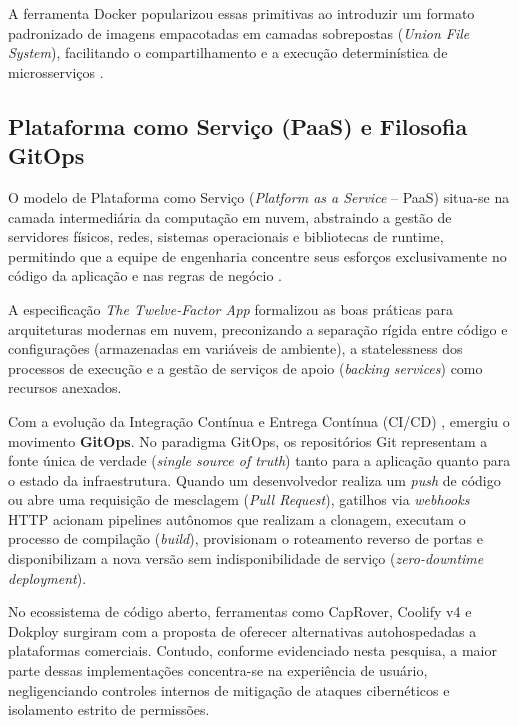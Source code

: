 A ferramenta Docker popularizou essas primitivas ao introduzir um formato padronizado de imagens empacotadas em camadas sobrepostas (\textit{Union File System}), facilitando o compartilhamento e a execução determinística de microsserviços \cite{merkel2014,combes2016}.

\subsection{Plataforma como Serviço (PaaS) e Filosofia GitOps}
\label{sec:paas-gitops}

O modelo de Plataforma como Serviço (\textit{Platform as a Service} -- PaaS) situa-se na camada intermediária da computação em nuvem, abstraindo a gestão de servidores físicos, redes, sistemas operacionais e bibliotecas de runtime, permitindo que a equipe de engenharia concentre seus esforços exclusivamente no código da aplicação e nas regras de negócio \cite{bass2015,newman2021}. 

A especificação \textit{The Twelve-Factor App} \cite{wiggins2017} formalizou as boas práticas para arquiteturas modernas em nuvem, preconizando a separação rígida entre código e configurações (armazenadas em variáveis de ambiente), a statelessness dos processos de execução e a gestão de serviços de apoio (\textit{backing services}) como recursos anexados.

Com a evolução da Integração Contínua e Entrega Contínua (CI/CD) \cite{fowler2006,humble2010}, emergiu o movimento \textbf{GitOps}. No paradigma GitOps, os repositórios Git representam a fonte única de verdade (\textit{single source of truth}) tanto para a aplicação quanto para o estado da infraestrutura. Quando um desenvolvedor realiza um \textit{push} de código ou abre uma requisição de mesclagem (\textit{Pull Request}), gatilhos via \textit{webhooks} HTTP acionam pipelines autônomos que realizam a clonagem, executam o processo de compilação (\textit{build}), provisionam o roteamento reverso de portas e disponibilizam a nova versão sem indisponibilidade de serviço (\textit{zero-downtime deployment}).

No ecossistema de código aberto, ferramentas como CapRover, Coolify v4 e Dokploy surgiram com a proposta de oferecer alternativas autohospedadas a plataformas comerciais. Contudo, conforme evidenciado nesta pesquisa, a maior parte dessas implementações concentra-se na experiência de usuário, negligenciando controles internos de mitigação de ataques cibernéticos e isolamento estrito de permissões.

